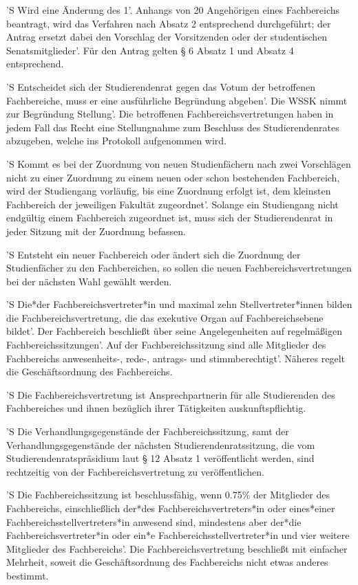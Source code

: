 \documentclass[fontsize=12pt,parskip=half]{scrartcl}
\begin{document}
\begin{contract}
  'S Wird eine Änderung des 1'. Anhangs von 20 Angehörigen eines Fachbereichs
  beantragt, wird das Verfahren nach Absatz 2 entsprechend durchgeführt; der
  Antrag ersetzt dabei den Vorschlag der Vorsitzenden oder der studentischen
  Senatsmitglieder'. Für den Antrag gelten § 6 Absatz 1 und Absatz 4
  entsprechend.

  'S Entscheidet sich der Studierendenrat gegen das Votum der betroffenen
  Fachbereiche, muss er eine ausführliche Begründung abgeben'. Die WSSK nimmt zur
  Begründung Stellung'. Die betroffenen Fachbereichsvertretungen haben in jedem
  Fall das Recht eine Stellungnahme zum Beschluss des Studierendenrates
  abzugeben, welche ins Protokoll aufgenommen wird.

  'S Kommt es bei der Zuordnung von neuen Studienfächern nach zwei Vorschlägen
  nicht zu einer Zuordnung zu einem neuen oder schon bestehenden Fachbereich,
  wird der Studiengang vorläufig, bis eine Zuordnung erfolgt ist, dem kleinsten
  Fachbereich der jeweiligen Fakultät zugeordnet'. Solange ein Studiengang nicht
  endgültig einem Fachbereich zugeordnet ist, muss sich der Studierendenrat in
  jeder Sitzung mit der Zuordnung befassen.

  'S Entsteht ein neuer Fachbereich oder ändert sich die Zuordnung der
  Studienfächer zu den Fachbereichen, so sollen die neuen
  Fachbereichsvertretungen bei der nächsten Wahl gewählt werden.



  'S Die*der Fachbereichsvertreter*in und maximal zehn Stellvertreter*innen bilden
  die Fachbereichsvertretung, die das exekutive Organ auf Fachbereichsebene
  bildet'. Der Fachbereich beschließt über seine Angelegenheiten auf regelmäßigen
  Fachbereichssitzungen'. Auf der Fachbereichssitzung sind alle Mitglieder des
  Fachbereichs anwesenheits-, rede-, antrags- und stimmberechtigt'. Näheres
  regelt die Geschäftsordnung des Fachbereichs.

  'S Die Fachbereichsvertretung ist Ansprechpartnerin für alle Studierenden des
  Fachbereiches und ihnen bezüglich ihrer Tätigkeiten auskunftspflichtig.

  'S Die Verhandlungsgegenstände der Fachbereichssitzung, samt der
  Verhandlungsgegenstände der nächsten Studierendenratssitzung, die vom
  Studierendenratspräsidium laut § 12 Absatz 1 veröffentlicht werden, sind
  rechtzeitig von der Fachbereichsvertretung zu veröffentlichen.

  'S Die Fachbereichssitzung ist beschlussfähig, wenn 0.75\% der Mitglieder des
  Fachbereichs, einschließlich der*des Fachbereichsvertreters*in oder
  eines*einer Fachbereichsstellvertreters*in anwesend sind, mindestens aber
  der*die Fachbereichsvertreter*in oder ein*e Fachbereichsstellvertreter*in und
  vier weitere Mitglieder des Fachbereichs'. Die Fachbereichsvertretung
  beschließt mit einfacher Mehrheit, soweit die Geschäftsordnung des
  Fachbereichs nicht etwas anderes bestimmt.


\end{contract}
\end{document}
